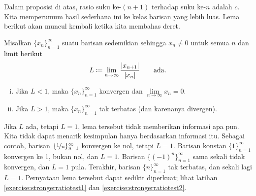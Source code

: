 Dalam proposisi di atas,
rasio suku ke-$(n+1)$ terhadap suku ke-$n$ adalah $c$.  Kita
memperumum hasil sederhana ini ke kelas barisan yang lebih luas.
Lema berikut akan muncul kembali ketika kita membahas deret.

\begin{lemma}
\label{seq:ratiotest}
Misalkan $\{ x_n \}_{n=1}^\infty$ suatu barisan sedemikian sehingga $x_n \neq 0$ untuk semua $n$ dan
limit berikut
\begin{equation*}
L \coloneqq \lim_{n\to\infty} \frac{\lvert {x_{n+1}} \rvert}{\lvert {x_n} \rvert}
\qquad
\text{ada.}
\end{equation*}
\begin{enumerate}[(i)]
\item
Jika $L < 1$, maka $\{ x_n \}_{n=1}^\infty$ konvergen dan $\lim\limits_{n\to\infty} x_n = 0$.
\item
Jika $L > 1$, maka $\{ x_n \}_{n=1}^\infty$ tak terbatas (dan karenanya divergen).
\end{enumerate}
\end{lemma}

Jika $L$ ada, tetapi $L=1$, lema tersebut tidak memberikan informasi apa pun.  Kita tidak dapat menarik
kesimpulan hanya berdasarkan informasi itu.  Sebagai contoh,
barisan $\{ \nicefrac{1}{n} \}_{n=1}^\infty$ konvergen ke nol, tetapi $L=1$.
Barisan konstan $\{ 1 \}_{n=1}^\infty$ konvergen ke 1, bukan nol, dan
$L=1$.  Barisan $\bigl\{ {(-1)}^n \bigr\}_{n=1}^\infty$ sama sekali tidak konvergen, dan
$L=1$ pula.
Terakhir, barisan $\{  n \}_{n=1}^\infty$ tak terbatas, dan sekali lagi $L=1$.
Pernyataan lema tersebut dapat sedikit diperkuat; lihat
latihan \ref{exercise:strongerratiotest1} dan
\ref{exercise:strongerratiotest2}.

